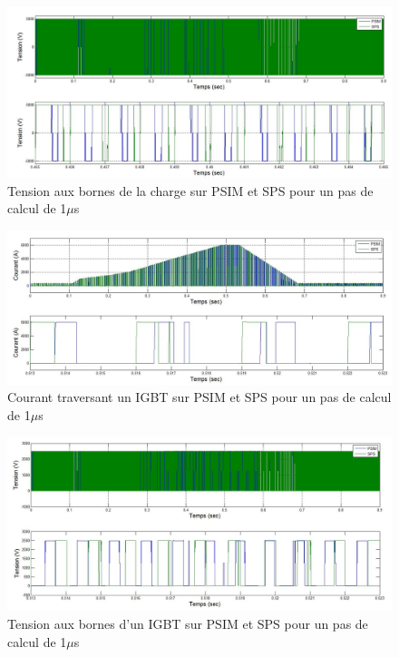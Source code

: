 \documentclass[11pt,letterpaper,final]{report}
\begin{document}
\begin{figure}[htb]
\centering
\includegraphics[scale=0.5]{Fig/DCPDCN/DCPTensionCharge1u.jpg}
\caption{Tension aux bornes de la charge sur PSIM et SPS pour un pas de calcul de 1$\mu$s}
\label{DC_ch_ten_1}
\end{figure}


\begin{figure}[htb]
\centering
\includegraphics[scale=0.5]{Fig/DCPDCN/DCPCourantIGBT1u.jpg}
\caption{Courant traversant un IGBT sur PSIM et SPS pour un pas de calcul de 1$\mu$s}
\label{DC_IG_cou_1}
\end{figure}


\begin{figure}[htb]
\centering
\includegraphics[scale=0.5]{Fig/DCPDCN/DCPTensionIGBT1u.jpg}
\caption{Tension aux bornes d'un IGBT sur PSIM et SPS pour un pas de calcul de 1$\mu$s}
\label{DC_IG_ten_1}
\end{figure}
\end{document}
